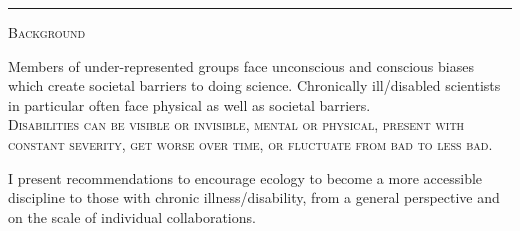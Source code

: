 \documentclass{beamer}
\begin{document}
\begin{center}
\rule{\linewidth}{0.3cm}
\vspace{10cm}
\begin{minipage}{0.25\linewidth}
\begin{Large}
\vspace{0.5cm}
\textsc{Background}\\
\end{Large}
Members of under-represented groups face unconscious and conscious biases which create societal barriers to doing science.  Chronically ill/disabled scientists in particular often face physical as well as societal barriers.\\ 

\textsc{Disabilities can be visible or invisible, mental or physical, present with constant severity, get worse over time, or fluctuate from bad to less bad.\\ } 

I present recommendations to encourage ecology to become a more accessible discipline to those with chronic illness/disability, from a general perspective and on the scale of individual collaborations.\\


\end{minipage}
\end{center}
\end{document}
